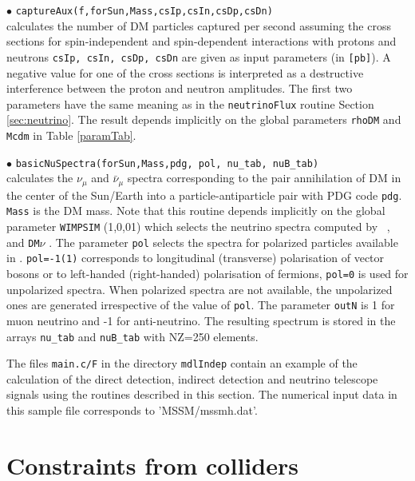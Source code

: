 \documentclass[12pt,a4paper]{article}
\begin{document}
{\noindent $\bullet$ \verb|captureAux(f,forSun,Mass,csIp,csIn,csDp,csDn)|\\
calculates the number of DM particles captured per second assuming the cross sections
for  spin-independent and spin-dependent 
interactions with protons and neutrons   {\tt csIp, csIn, csDp, csDn} are
given as input parameters (in {\tt [pb]}). 
A negative value for one of the cross sections  is interpreted as a destructive
interference between the  proton and neutron amplitudes. The first two
parameters have the same meaning as in the {\tt neutrinoFlux} routine Section \ref{sec:neutrino}. The
result  depends implicitly on the global parameters {\tt rhoDM} and {\tt
Mcdm} in Table \ref{paramTab}. 


\noindent

$\bullet$ \verb|basicNuSpectra(forSun,Mass,pdg, pol, nu_tab, nuB_tab) |\\
calculates  the $\nu_{\mu}$   and  $\bar{\nu}_{\mu}$ spectra
corresponding to the pair annihilation of DM in the center of the Sun/Earth
into a particle-antiparticle pair with PDG code {\tt pdg}. \verb|Mass| is the DM mass.
Note that this
routine depends implicitly on the global parameter {\tt WIMPSIM} (1,0,01) which selects the neutrino spectra computed by
 \wimpsim~\cite{Blennow:2007tw}, \pppc~\cite{Baratella:2013fya} and  {\tt DM$\nu$}
\cite{Cirelli:2005gh}.
The parameter {\tt pol} selects the spectra for  polarized particles available  in
\pppc. {\tt pol=-1(1)} corresponds to longitudinal (transverse) polarisation
of vector bosons or to left-handed (right-handed)  polarisation of  fermions, {\tt pol=0}
is used for unpolarized spectra. When polarized spectra are not available, the unpolarized ones are generated irrespective of the value of \verb|pol|. 
The parameter {\tt outN} is 1 for muon neutrino and -1 for anti-neutrino. The resulting spectrum is stored in the
arrays   \verb|nu_tab| and \verb|nuB_tab| with NZ=250 elements.

The files {\verb|main.c/F|} in the directory {\tt mdlIndep}  contain an example of the calculation of the direct detection,  indirect detection 
and neutrino telescope signals using the routines described in this section. 
The numerical input data in this sample file corresponds to 'MSSM/mssmh.dat'. 



\section{Constraints from colliders}


}
\end{document}
